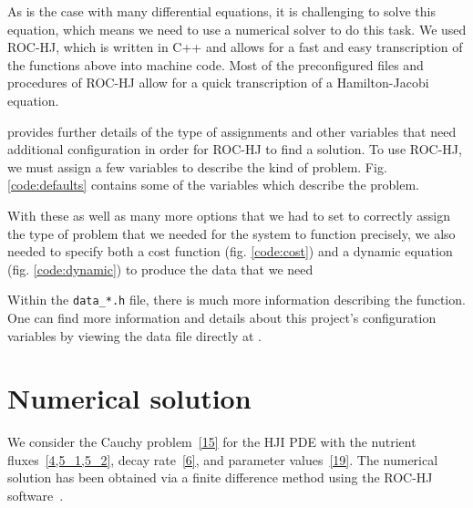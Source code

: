 \documentclass[11pt]{amsart}
\begin{document}
As is the case with many differential equations, it is challenging to solve
this equation, which means we need to use a numerical solver to do this task.
We used ROC-HJ, which is written in C++ and allows for a fast and easy
transcription of the functions above into machine code. Most of the
preconfigured files and procedures of ROC-HJ allow for a quick transcription
of a Hamilton-Jacobi equation.


\cite{ROCHJ2019} provides further details of the type of assignments and
other variables that need additional configuration in order for ROC-HJ to find
a solution. To use ROC-HJ, we must assign a few variables to describe the kind
of problem. Fig. \ref{code:defaults} contains some of the variables which
describe the problem.



With these as well as many more options that we had to set to correctly assign
the type of problem that we needed for the system to function precisely, we
also needed to specify both a cost function (fig. \ref{code:cost}) and a
dynamic equation (fig. \ref{code:dynamic}) to produce the data that we need


Within the \texttt{data\_*.h} file, there is much more information describing
the function. One can find more information and details about this project's
configuration variables by viewing the data file directly at \cite{data_ivan.h}.

\section{Numerical solution}

We consider the Cauchy problem~\cref{15} for the HJI PDE with the nutrient
fluxes~\cref{4,5_1,5_2}, decay rate~\cref{6}, and parameter values~\cref{19}.
The numerical solution has been obtained via a finite difference method
\cite{FlemingSoner2006,
      OsherShu1991,
      BotkinHoffmannTurova2011,
      BokanForcadelZidani2010}
using the ROC-HJ software~\cite{ROCHJ2019}.
\end{document}
